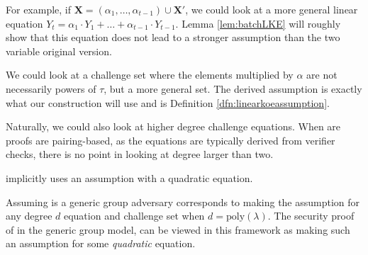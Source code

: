 \documentclass[11pt]{article}
\numberwithin{figure}{section} %
\newcommand{\X}{\ensuremath{\mathbf{X}}\xspace}
\newcommand{\poly}{\ensuremath{\mathrm{poly}(\lambda)}\xspace}
\begin{document}
For example, if $\X=(\alpha_1,\ldots,\alpha_{t-1})\cup \X'$, we could look at a more general linear equation
$Y_t= \alpha_1\cdot Y_1 +\ldots + \alpha_{t-1}\cdot Y_{t-1}$.
Lemma \ref{lem:batchLKE} will roughly show that this equation does not lead to a stronger assumption than the two variable original version.

We could look at a challenge set where the elements multiplied by $\alpha$ are not necessarily powers of $\tau$, but a more general set. The derived assumption is exactly what our construction will use and is Definition \ref{dfn:linearkoeassumption}.

Naturally, we could also look at higher degree challenge equations. When are proofs are pairing-based, as the equations are typically derived from verifier checks, there is no point in looking at degree larger than two.

\cite{Groth16} implicitly uses an assumption with a quadratic equation.

Assuming \adv is a generic group adversary corresponds to making the assumption for any degree $d$ equation and challenge set when $d=\poly$.
The security proof of \cite{Groth16} in the generic group model, can be viewed in this framework as making such an assumption for some \emph{quadratic} equation.
\end{document}
